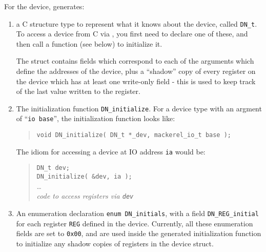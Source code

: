 \documentclass[a4paper,11pt,twoside]{report}
\begin{document}
For the device, \Mac generates: 

\begin{enumerate}

\item a C structure type to represent what it knows about the
  device, called \texttt{DN\_t}.  To access a device from C via \Mac,
  you first need to declare one of these, and then call a function
  (see below) to initialize it. 
  
  The struct contains fields which correspond to each of the arguments
  which define the addresses of the device, plus a ``shadow'' copy of
  every register on the device which has at least one write-only field -
  this is used to keep track of the last value written to the register. 

\item The initialization function \texttt{DN\_initialize}.  For a
  device type with an argment of ``\texttt{io base}'', the
  initialization function looks like:

  \begin{quote}
    \texttt{void DN\_initialize( DN\_t *\_dev, mackerel\_io\_t base );}
  \end{quote}
  
  The idiom for accessing a device at IO address \texttt{ia} would be:
  
  \begin{quote}
    \texttt{DN\_t dev;}\\
    \texttt{DN\_initialize( \&dev, ia );}\\
    \ldots\\
    \textit{code to access registers via \texttt{dev}}
  \end{quote}

\item An enumeration declaration \texttt{enum
  DN\_initials}, with a field \texttt{DN\_REG\_initial} for each
  register \texttt{REG} defined in the device.  Currently, all these
  enumeration fields are set to \texttt{0x00}, and are used inside the
  generated initialization function to initialize any shadow copies of
  registers in the device struct.  
  

\end{enumerate}
\end{document}
